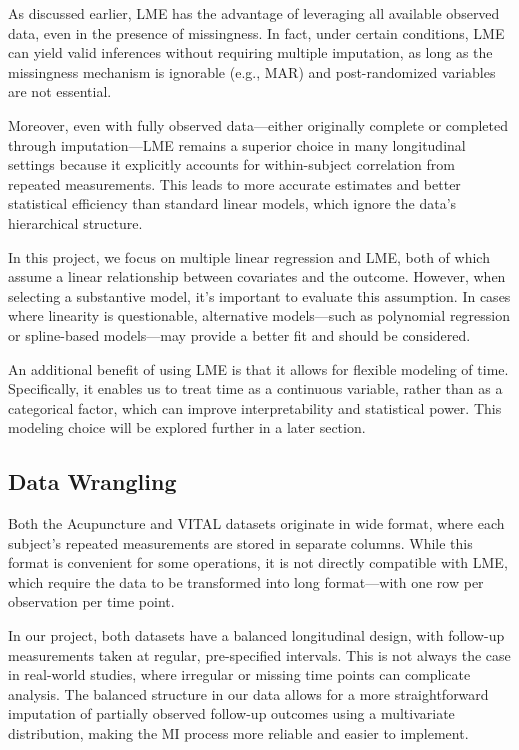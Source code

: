 \documentclass{article}
\begin{document}
As discussed earlier, LME has the advantage of leveraging all available
observed data, even in the presence of missingness. In fact, under
certain conditions, LME can yield valid inferences without requiring
multiple imputation, as long as the missingness mechanism is ignorable
(e.g., MAR) and post-randomized variables are not essential.

Moreover, even with fully observed data---either originally complete or
completed through imputation---LME remains a superior choice in many
longitudinal settings because it explicitly accounts for within-subject
correlation from repeated measurements. This leads to more accurate
estimates and better statistical efficiency than standard linear models,
which ignore the data's hierarchical structure.

In this project, we focus on multiple linear regression and LME, both of
which assume a linear relationship between covariates and the outcome.
However, when selecting a substantive model, it's important to evaluate
this assumption. In cases where linearity is questionable, alternative
models---such as polynomial regression or spline-based models---may
provide a better fit and should be considered.

An additional benefit of using LME is that it allows for flexible
modeling of time. Specifically, it enables us to treat time as a
continuous variable, rather than as a categorical factor, which can
improve interpretability and statistical power. This modeling choice
will be explored further in a later section.

\subsection{Data Wrangling}\label{data-wrangling}

Both the Acupuncture and VITAL datasets originate in wide format, where
each subject's repeated measurements are stored in separate columns.
While this format is convenient for some operations, it is not directly
compatible with LME, which require the data to be transformed into long
format---with one row per observation per time point.

In our project, both datasets have a balanced longitudinal design, with
follow-up measurements taken at regular, pre-specified intervals. This
is not always the case in real-world studies, where irregular or missing
time points can complicate analysis. The balanced structure in our data
allows for a more straightforward imputation of partially observed
follow-up outcomes using a multivariate distribution, making the MI
process more reliable and easier to implement.
\end{document}
